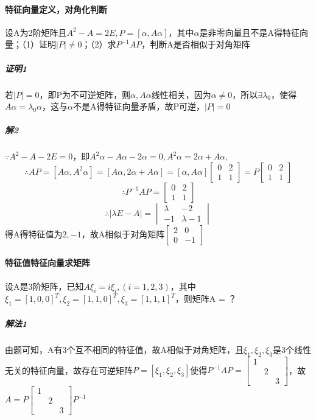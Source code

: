 \paragraph{特征向量定义，对角化判断}
设A为2阶矩阵且\(A^2 - A = 2E, P = [\alpha, A\alpha]\)，其中\(\alpha\)是非零向量且不是A得特征向量；（1）证明\(|P| \neq 0\)；（2）求\(P^{-1}AP\)，判断A是否相似于对角矩阵

\subparagraph{证明1}
若\(|P| = 0\)，即P为不可逆矩阵，则\(\alpha, A\alpha\)线性相关，因为\(\alpha \neq 0\)，所以\(\exists \lambda_0\)，使得\(A\alpha = \lambda_0\alpha\)，这与\(\alpha\)不是A得特征向量矛盾，故P可逆，\(|P| = 0\)

\subparagraph{解2}
\(\because A^2 - A - 2E = 0\)，即\(A^2\alpha - A\alpha - 2\alpha = 0, A^2\alpha = 2\alpha + A\alpha, \)\[\therefore AP = [A\alpha, A^2\alpha] = [A\alpha, 2\alpha + A\alpha] = [\alpha, A\alpha]\begin{bmatrix}
    0 & 2 \\ 
    1 & 1
\end{bmatrix} = P\begin{bmatrix}
    0 & 2 \\ 
    1 & 1
\end{bmatrix}\]
\[\therefore P^{-1}AP = \begin{bmatrix}
    0 & 2 \\ 
    1 & 1
\end{bmatrix}\]
\[\therefore |\lambda E - A| = \begin{vmatrix}
    \lambda & -2 \\ 
    -1 & \lambda - 1
\end{vmatrix}\]
得A得特征值为\(2, -1\)，故A相似于对角矩阵\(\begin{bmatrix}
    2 & 0 \\ 
    0 & -1
\end{bmatrix}\)

\paragraph{特征值特征向量求矩阵}
设A是3阶矩阵，已知\(A\xi_i = i\xi_i, (i = 1, 2, 3)\)，其中\(\xi_1 = [1, 0, 0]^T, \xi_2 = [1, 1, 0]^T, \xi_3 = [1, 1, 1]^T\)，则矩阵A = ？
\subparagraph{解法1}
由题可知，A有3个互不相同的特征值，故A相似于对角矩阵，且\(\xi_1, \xi_2, \xi_3\)是3个线性无关的特征向量，故存在可逆矩阵\(P = [\xi_1, \xi_2, \xi_3]\)使得\(P^{-1}AP = \begin{bmatrix}
    1 & & \\ 
    & 2 & \\ 
    & & 3
\end{bmatrix}\)，故\(A = P\begin{bmatrix}
    1 & & \\ 
    & 2 & \\ 
    & & 3
\end{bmatrix}P^{-1}\)

